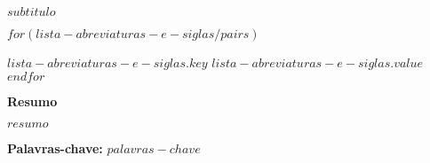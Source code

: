 \documentclass[
	12pt,       %
  $if(book_format)$
    openright, %
  	twoside,   %
  $else$
  	oneside,    %
  	openany,    %
  $endif$
	english,	%
	french,		%
	spanish,	%
	brazil,		%
	]{abntex2}
\renewcommand{\imprimircapa}{%
  \begin{capa}%
    \center
    \ABNTEXchapterfont\large\imprimirautor

    \vfill
    \begin{center}
    \ABNTEXchapterfont\bfseries\LARGE\imprimirtitulo
    \end{center}
    \begin{center}
    \ABNTEXchapterfont\large{$subtitulo$}
    \end{center}
    \vfill

    \large\imprimirlocal

    \large\imprimirdata

    \vspace*{1cm}
  \end{capa}
}
\begin{document}

\frenchspacing

\imprimircapa

\imprimirfolhaderosto

\listoffigures*
\cleardoublepage

\listoftables*
\cleardoublepage

 \begin{siglas}
  $for(lista-abreviaturas-e-siglas/pairs)$
    \item[$lista-abreviaturas-e-siglas.key$] $lista-abreviaturas-e-siglas.value$
  $endfor$
 \end{siglas}

\begin{sffamily}
\noindent\normalsize{\textbf{Resumo}}

\noindent\small{$resumo$}

\noindent\normalsize{\textbf{Palavras-chave: }}\small{$palavras-chave$}
\end{sffamily}
\tableofcontents*
\cleardoublepage
\textual
\end{document}
